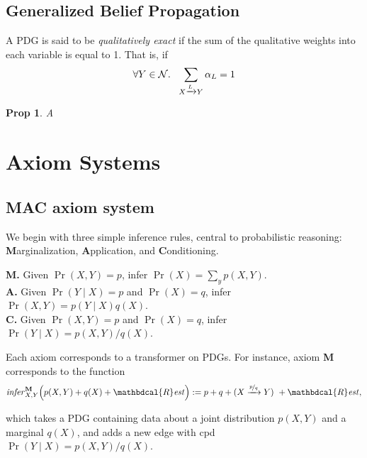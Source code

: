 \documentclass{article}
\theoremstyle{plain}
\newtheorem{prop}[theorem]{Prop}
\theoremstyle{definition}
\theoremstyle{remark}
\newcommand{\N}{\mathcal N}
\newcommand{\dg}[1]{\mathbdcal{#1}}
\newcommand{\bundle}{\mathbin{+}}
\newcommand{\ed}[3]{%
		\mathchoice%
		{#2\overset{\smash{\mskip-5mu\raisebox{-3pt}{${#1}$}}}{\xrightarrow{\hphantom{\scriptstyle {#1}}}} #3} %
		{#2\overset{\smash{\mskip-5mu\raisebox{-3pt}{$\scriptstyle {#1}$}}}{\xrightarrow{\hphantom{\scriptstyle {#1}}}} #3}%
		{#2\overset{\smash{\mskip-5mu\raisebox{-3pt}{$\scriptscriptstyle {#1}$}}}{\xrightarrow{\hphantom{\scriptscriptstyle {#1}}}} #3} %
		{#2\overset{\smash{\mskip-5mu\raisebox{-3pt}{$\scriptscriptstyle {#1}$}}}{\xrightarrow{\hphantom{\scriptscriptstyle {#1}}}} #3}} %
\newcommand{\alle}[1][L]{_{\ed {#1}XY}}
\begin{document}
\subsection{Generalized Belief Propagation}

\begin{defn}
	A PDG is said to be \emph{qualitatively exact} if the sum of the qualitative weights into each variable is equal to 1.
	That is, if
	\[ \forall Y \in \N.~~ \sum\alle \alpha_{L} = 1  \]
\end{defn}

\begin{prop}
	A
\end{prop}

\section{Axiom Systems}

\subsection{MAC axiom system}
We begin with three simple inference rules, central to probabilistic reasoning: \textbf Marginalization, \textbf Application, and \textbf Conditioning.

\textbf{M.} Given $\Pr(X,Y) = p$, infer $\Pr(X) = \sum_y p(X,Y)$. \\
\textbf{A.} Given $\Pr(Y \mid X) = p$ and $\Pr(X) = q$, infer $\Pr(X, Y) = p(Y \mid X) q(X)$. \\
\textbf{C.} Given $\Pr(X,Y) = p$ and $\Pr(X) = q$, infer $\Pr(Y \mid X) = p(X,Y) / q(X)$.

Each axiom corresponds to a transformer on PDGs. For instance, axiom \textbf{M} corresponds to the function
\begin{align*}
	\mathit{infer}^{\textbf{M}}_{X,Y} \Big(p(X,Y) \bundle q(X) \bundle \dg R\mathit{est} \Big)
	:=
	p \bundle q \bundle  (X \xrightarrow{\nicefrac pq} Y)~\bundle \dg R\mathit{est}, \\
\end{align*}
	
which takes a PDG containing data about a joint distribution $p(X,Y)$ and a marginal $q(X)$, and adds a new edge with cpd $\Pr(Y \mid X) = p(X,Y)/ q(X)$.
\end{document}
